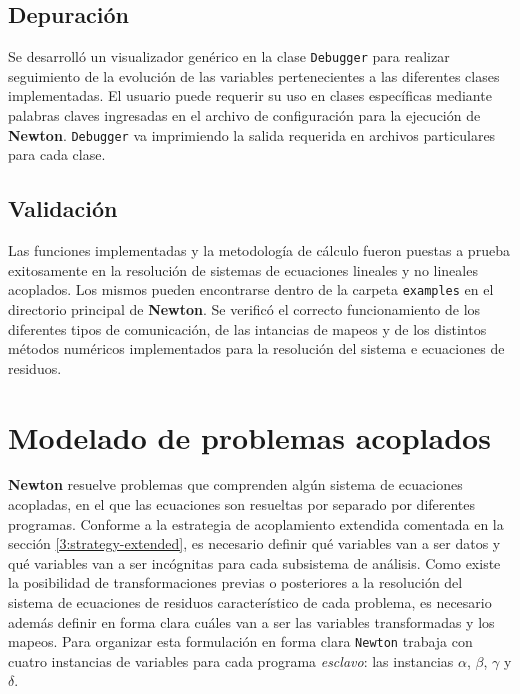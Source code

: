 \subsection*{Depuración}
\label{ap2:debug}

Se desarrolló un visualizador genérico en la clase \texttt{Debugger} para realizar seguimiento de la evolución de las variables pertenecientes a las diferentes clases implementadas.
El usuario puede requerir su uso en clases específicas mediante palabras claves ingresadas en el archivo de configuración para la ejecución de \textbf{Newton}.
\texttt{Debugger} va imprimiendo la salida requerida en archivos particulares para cada clase.

\subsection*{Validación}
\label{ap2:bench}

Las funciones implementadas y la metodología de cálculo fueron puestas a prueba exitosamente en la resolución de sistemas de ecuaciones lineales y no lineales acoplados.
Los mismos pueden encontrarse dentro de la carpeta \texttt{examples} en el directorio principal de \textbf{Newton}.
Se verificó el correcto funcionamiento de los diferentes tipos de comunicación, de las intancias de mapeos y de los distintos métodos numéricos implementados para la resolución del sistema e ecuaciones de residuos.

\section{Modelado de problemas acoplados}
\label{ap1:definicion}

\textbf{Newton} resuelve problemas que comprenden algún sistema de ecuaciones acopladas, en el que las ecuaciones son resueltas por separado por diferentes programas.
Conforme a la estrategia de acoplamiento extendida comentada en la sección \ref{3:strategy-extended}, 
es necesario definir qué variables van a ser datos y qué variables van a ser incógnitas para cada subsistema de análisis.
Como existe la posibilidad de transformaciones previas o posteriores a la resolución del sistema de ecuaciones de residuos característico de cada problema,
es necesario además definir en forma clara cuáles van a ser las variables transformadas y los mapeos.
Para organizar esta formulación en forma clara \texttt{Newton} trabaja con cuatro instancias de variables para cada programa \textit{esclavo}:
las instancias $\alpha$, $\beta$, $\gamma$ y $\delta$.

